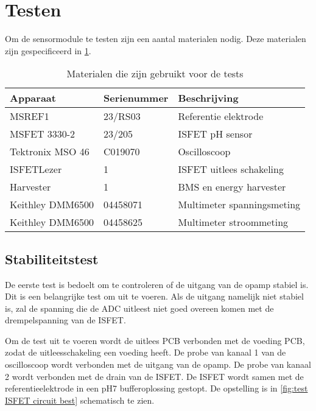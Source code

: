 \section{Testen}
Om de sensormodule te testen zijn een aantal materialen nodig. Deze materialen zijn gespecificeerd in \cref{tab:testMaterialen}.
\begin{table}[ht]
    \centering
    \begin{tabular}{l|l|l}
        Apparaat         & Serienummer & Beschrijving \\
        \hline
        MSREF1           & 23/RS03     & Referentie elektrode       \\
        MSFET 3330-2     & 23/205      & ISFET pH sensor            \\
        Tektronix MSO 46 & C019070     & Oscilloscoop               \\
        ISFETLezer       & 1           & ISFET uitlees schakeling   \\
        Harvester        & 1           & BMS en energy harvester    \\
        Keithley DMM6500 & 04458071    & Multimeter spanningsmeting \\
        Keithley DMM6500 & 04458625    & Multimeter stroommeting    \\

        \hline
    \end{tabular}
    \caption{Materialen die zijn gebruikt voor de tests}
    \label{tab:testMaterialen}
\end{table}

\subsection{Stabiliteitstest}
De eerste test is bedoelt om te controleren of de uitgang van de opamp stabiel is. Dit is een belangrijke test om uit te voeren. Als de uitgang namelijk niet stabiel is, zal de spanning die de ADC uitleest niet goed overeen komen met de drempelspanning van de ISFET.

Om de test uit te voeren wordt de uitlees PCB verbonden met de voeding PCB, zodat de uitleesschakeling een voeding heeft. De probe van kanaal 1 van de oscilloscoop wordt verbonden met de uitgang van de opamp. De probe van kanaal 2 wordt verbonden met de drain van de ISFET. De ISFET wordt samen met de referentieelektrode in een pH7 bufferoplossing gestopt. De opstelling is in \cref{fig:test ISFET circuit best} schematisch te zien.

